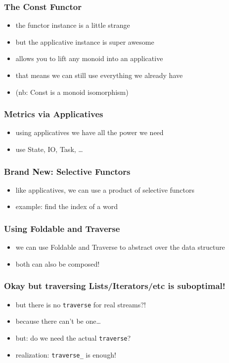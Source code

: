 \documentclass{beamer}
\begin{document}
\begin{frame}
  \frametitle{The Const Functor}
  \begin{itemize}
  \item the functor instance is a little strange
  \item but the applicative instance is super awesome
  \item allows you to lift any monoid into an applicative
  \item that means we can still use everything we already have
  \item (nb: Const is a monoid isomorphism)
  \end{itemize}
\end{frame}

\begin{frame}
  \frametitle{Metrics via Applicatives}
  \begin{itemize}
  \item using applicatives we have all the power we need
  \item use State, IO, Task, \ldots
  \end{itemize}
\end{frame}

\begin{frame}
  \frametitle{Brand New: Selective Functors}
  \begin{itemize}
  \item like applicatives, we can use a product of selective functors
  \item example: find the index of a word
  \end{itemize}
\end{frame}

\begin{frame}
  \frametitle{Using Foldable and Traverse}
  \begin{itemize}
  \item we can use Foldable and Traverse to abstract over the data structure
  \item both can also be composed!
  \end{itemize}
\end{frame}

\begin{frame}
  \frametitle{Okay but traversing Lists/Iterators/etc is suboptimal!}
  \begin{itemize}
  \item but there is no \texttt{traverse} for real streams?!
  \item because there can't be one\ldots
  \item but: do we need the actual \texttt{traverse}?
  \item realization: \texttt{traverse\_} is enough!
  \end{itemize}
\end{frame}
\end{document}
